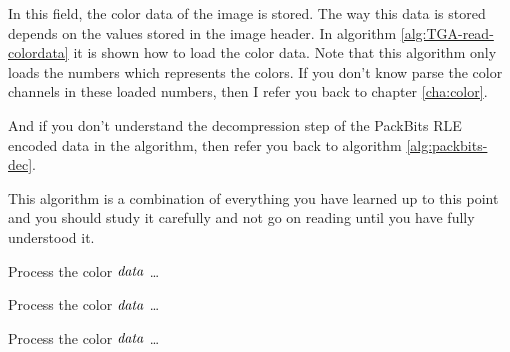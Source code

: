 
In this field, the color data of the image is stored. The way this
data is stored depends on the values stored in the image header. In
algorithm \ref{alg:TGA-read-colordata} it is shown how to load the
color data. Note that this algorithm only loads the numbers which
represents the colors. If you don't know parse the color channels in
these loaded numbers, then I refer you back to chapter
\ref{cha:color}.

And if you don't understand the decompression step of the PackBits RLE
encoded data in the algorithm, then refer you back to algorithm
\ref{alg:packbits-dec}.

This algorithm is a combination of everything you have learned up to
this point and you should study it carefully and not go on reading until
you have fully understood it.

\begin{algorithm}[H]
  \caption{Reading and decompressing the color data of a \tga file}\algohack{}
  \label{alg:TGA-read-colordata}
  \newcommand{\process}{\State Process the color $\var{data}$ \dots}
  \begin{algorithmic}[1]





        \EndIf

          \process
        \EndRepeatn

    \Else



        \EndIf

        \process


        \EndRepeatn

       \EndIf
    \Else


      \EndIf

      \process


    \EndIf
    \EndWhile
  \end{algorithmic}
\end{algorithm}

